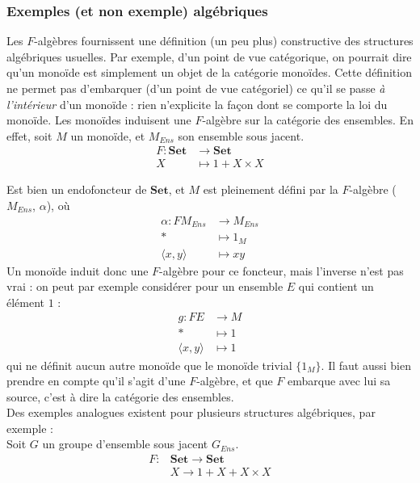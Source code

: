 \documentclass{article}
\begin{document}
\begin{center}
\end{center}

 
\subsubsection{Exemples (et non exemple) algébriques}
 
    Les $F$-algèbres fournissent une définition (un peu plus) constructive des structures algébriques usuelles. Par exemple, d'un point de vue catégorique, on pourrait dire qu'un monoïde est simplement un objet de la catégorie monoïdes. Cette définition ne permet pas d'embarquer (d'un point de vue catégoriel) ce qu'il se passe \textit{à l'intérieur} d'un monoïde : rien n'explicite la façon dont se comporte la loi du monoïde. Les monoïdes induisent une $F$-algèbre sur la catégorie des ensembles. En effet, soit $M$ un monoïde, et $ M_{Ens}$ son ensemble sous jacent.  
\begin{align*}
    F : \mathbf{Set} & \rightarrow \mathbf{Set} \\
    X & \mapsto 1 + X \times X
\end{align*}

Est bien un endofoncteur de $\mathbf{Set}$, et $M$ est pleinement défini par la $F$-algèbre ($M_{Ens}$, $\alpha$), où 
\begin{align*}
    \alpha : FM_{Ens} & \rightarrow M_{Ens} \\ 
                * & \mapsto 1_M \\ 
                \langle x, y \rangle & \mapsto xy
\end{align*}    
Un monoïde induit donc une $F$-algèbre pour ce foncteur, mais l'inverse n'est pas vrai : on peut par exemple considérer pour un ensemble $E$ qui contient un élément $1$ :
\begin{align*}
    g : F E & \rightarrow M \\
     * & \mapsto 1 \\ 
     \langle x,y \rangle & \mapsto 1 
\end{align*}
qui ne définit aucun autre monoïde que le monoïde trivial $\{ 1_M \} $. Il faut aussi bien prendre en compte qu'il s'agit d'une $F$-algèbre, et que $F$ embarque avec lui sa source, c'est à dire la catégorie des ensembles. 
\\ 
Des exemples analogues existent pour plusieurs structures algébriques, par exemple : 
\\
Soit $G$ un groupe d'ensemble sous jacent $G_{Ens}$.
\begin{align*}
    F :&  \mathbf{Set}  \rightarrow \mathbf{Set}\\
      & X  \rightarrow 1 + X + X \times X
\end{align*}
\end{document}

